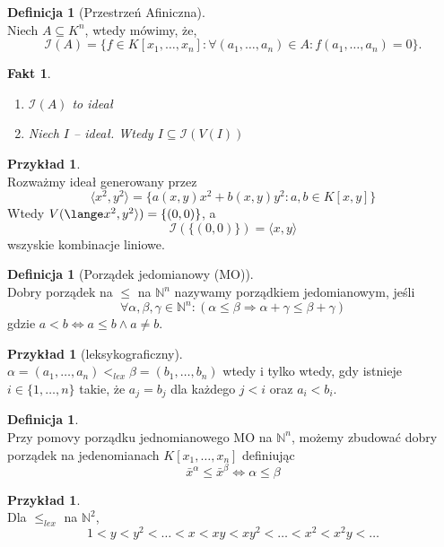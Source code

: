 \documentclass[11pt,a4paper]{article}
\newtheorem{fakt}[twierdzenie]{Fakt}
\theoremstyle{definition}
\newtheorem{definicja}[twierdzenie]{Definicja}
\newtheorem{przyklad}[twierdzenie]{Przykład}
\theoremstyle{remark}
\begin{document}
\begin{definicja}[Przestrzeń Afiniczna]~\\
    Niech $A \subseteq K^n$, wtedy mówimy, że, 
    \[
        \mathcal{I}(A) = \{ f \in K[x_1, \dots, x_n]: \forall (a_1, \dots, a_n) \in A: f(a_1, \dots, a_n) = 0\}.
    \]
\end{definicja}
\begin{fakt}
    \begin{enumerate}
        \item $\mathcal{I}(A)$ to ideał
        \item Niech $I$ -- ideał. Wtedy $I \subseteq \mathcal{I}(V(I))$
    \end{enumerate}
\end{fakt}
\begin{przyklad}~\\
    Rozważmy ideał generowany przez
    \[
        \langle x^2, y^2 \rangle = \{a(x,y)x^2+b(x,y)y^2: a,b \in K[x,y]\}
    \]
    Wtedy $V(\lange x^2, y^2 \rangle) = \{(0, 0)\}$, a 
    \[
        \mathcal{I}(\{(0, 0)\}) = \langle x, y \rangle
    \]
    wszyskie kombinacje liniowe.
\end{przyklad}
\begin{definicja}[Porządek jedomianowy (MO)]~\\
    Dobry porządek na $\leq$ na $\mathbb{N}^n$ nazywamy porządkiem jedomianowym, jeśli 
    \[
        \forall \alpha, \beta, \gamma \in \mathbb{N}^n: (\alpha \leq \beta \Rightarrow \alpha + \gamma \leq \beta + \gamma)
    \]
    gdzie $a < b \iff a \leq b \land a \neq b$.
\end{definicja}
\begin{przyklad}[leksykograficzny]~\\
    $\alpha = (a_1, \dots, a_n) <_{lex} \beta = (b_1, \dots, b_n)$ wtedy i tylko wtedy, gdy istnieje $i \in \{1, \dots, n\}$ takie, że $a_j = b_j$ dla każdego $j < i$ oraz $a_i < b_i$.
\end{przyklad}
\begin{definicja}~\\
    Przy pomovy porządku jednomianowego MO na $\mathbb{N}^n$, możemy zbudować dobry porządek na jedenomianach $K[x_1, \dots, x_n]$ definiując 
    \[
        \bar{x}^\alpha \leq \bar{x}^\beta \iff \alpha \leq \beta
    \]
\end{definicja}
\begin{przyklad}~\\
    Dla $\leq_{lex}$ na $\mathbb{N}^2$, 
    \[
        1 < y < y^2 < \dots < x < xy < xy^2 < \dots < x^2 < x^2y < \dots
    \]
\end{przyklad}
\end{document}
